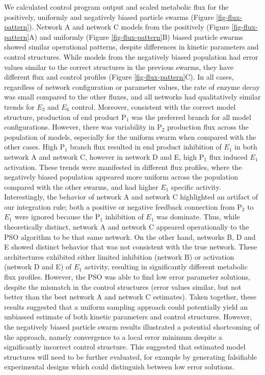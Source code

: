 \documentclass[processes,article,accept,moreauthors,pdftex,12pt,a4paper]{mdpi}
\begin{document}
We calculated control program output and scaled metabolic flux for the positively, uniformly and negatively biased particle swarms (Figure \ref{fig-flux-pattern}). 
Network A and network C models from the positively (Figure \ref{fig-flux-pattern}A) and uniformly (Figure \ref{fig-flux-pattern}B) biased particle swarms showed similar operational patterns, despite differences in kinetic parameters and control structures.
While models from the negatively biased population had error values similar to the correct structures in the previous swarms, they have different flux and control profiles (Figure \ref{fig-flux-pattern}C). 
In all cases, regardless of network configuration or parameter values, the rate of enzyme decay was small compared to the other fluxes, and all networks had qualitatively similar trends for $E_{3}$ and $E_{6}$ control. 
Moreover, consistent with the correct model structure, production of end product P$_1$ was the preferred branch for all model configurations. 
However, there was variability in P$_{2}$ production flux across the population of models, especially for the uniform swarm when compared with the other cases. 
High P$_{1}$ branch flux resulted in end product inhibition of $E_{1}$ in both network A and network C, however in network D and E, high P$_1$ flux induced $E_1$ activation. 
These trends were manifested in different flux profiles, where the negatively biased population appeared more uniform across the population compared with the other swarms, and had higher $E_{1}$ specific activity. 
Interestingly, the behavior of network A and network C highlighted an artifact of our integration rule; both a positive or negative feedback connection from P$_2$ to $E_{1}$ were ignored because the P$_{1}$ inhibition of $E_{1}$ was dominate. Thus, while theoretically distinct, network A and network C appeared operationally to the PSO algorithm to be that same network. 
On the other hand, networks B, D and E showed distinct behavior that was not consistent with the true network. 
These architectures exhibited either limited inhibition (network B) or activation (network D and E) of $E_{1}$ activity, resulting in significantly different metabolic flux profiles. 
However, the PSO was able to find low error parameter solutions, despite the mismatch in the control structures (error values similar, but not better than the best network A and network C estimates). 
Taken together, these results suggested that a uniform sampling approach could potentially yield an unbiassed estimate of both kinetic parameters and control structures. 
However, the negatively biased particle swarm results illustrated a potential shortcoming of the approach, namely convergence to a local error minimum despite a significantly incorrect control structure. 
This suggested that estimated model structures will need to be further evaluated, for example by generating falsifiable experimental designs which could distinguish between low error solutions.
\end{document}
